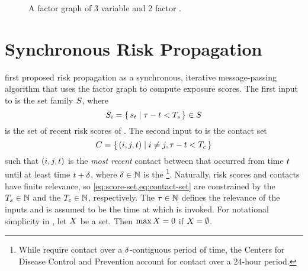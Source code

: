 \begin{figure}[htbp]
\centering
{}
\caption[Factor graph]{A factor graph of 3 variable \verticesName and 2 factor \verticesName.}
\label{fig:factor-graph}
\end{figure}

\section{Synchronous Risk Propagation}\label{sec:synchronous}

\citet{Ayday2021} first proposed risk propagation as a synchronous, iterative message-passing algorithm that uses the factor graph to compute exposure scores. The first input to \cRiskPropagation is the set family $S$, where
\begin{equation} \label{eq:score-set}
  S_i =\set{ s_t | \tau- t< T_s} \in S
\end{equation}
is the set of recent risk scores of . The second input to \cRiskPropagation is the contact set
\begin{equation} \label{eq:contact-set}
  C = \set{ (i, j, t) | i \neq j, \tau- t< T_c}
\end{equation}
such that $(i, j, t)$ is the \emph{most recent} contact between  that occurred from time $t$ until at least time $t + \delta$, where $\delta \in \mathbb{N}$ is the \footnote{While \citet{Ayday2021} require contact over a $\delta$-contiguous period of time, the Centers for Disease Control and Prevention \citeyearpar{CDC2021} account for contact over a 24-hour period.}. Naturally, risk scores and contacts have finite relevance, so \cref{eq:score-set,eq:contact-set} are constrained by the  $T_s \in \mathbb{N}$ and the  $T_c \in \mathbb{N}$, respectively. The  $\tau \in \mathbb{N}$ defines the relevance of the inputs and is assumed to be the time at which \cRiskPropagation is invoked. For notational simplicity in \cRiskPropagation, let $X$ be a set. Then $\max X = 0$ if $X = \emptyset$.

